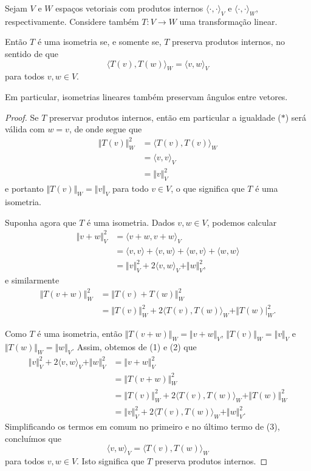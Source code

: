 \begin{theorem}
	Sejam $V$ e $W$ espaços vetoriais com produtos internos $\langle \cdot,\cdot\rangle_V$ e $\langle\cdot,\cdot\rangle_W$, respectivamente. Considere também $T\colon V\to W$ uma transformação linear.
	
	Então $T$ é uma isometria se, e somente se, $T$ preserva produtos internos, no sentido de que
	\[\langle T(v),T(w)\rangle_W=\langle v,w\rangle_V\tag{$*$}\]
	para todos $v,w\in V$.
	
	Em particular, isometrias lineares também preservam ângulos entre vetores.
\end{theorem}

\begin{proof}
	Se $T$ preservar produtos internos, então em particular a igualdade ($*$) será válida com $w=v$, de onde segue que
	\begin{align*}
		\Vert T(v)\Vert_W^2
			&=\langle T(v),T(v)\rangle_W\\
			&=\langle v,v\rangle_V\\
			&=\Vert v\Vert_V^2
	\end{align*}
	e portanto $\Vert T(v)\Vert_W=\Vert v\Vert_V$ para todo $v\in V$, o que significa que $T$ é uma isometria.
	
	Suponha agora que $T$ é uma isometria. Dados $v,w\in V$, podemos calcular
	\begin{align*}
		\Vert v+w\Vert_V^2
			&=\langle v+w,v+w\rangle_V\\
			&=\langle v,v\rangle+\langle v,w\rangle+\langle w,v\rangle+\langle w,w\rangle\\
			&=\Vert v\Vert_V^2+2\langle v,w\rangle_V+\Vert w\Vert_V^2,\tag{1}
	\end{align*}
	e similarmente
	\begin{align*}
		\Vert T(v+w)\Vert_W^2
			&=\Vert T(v)+T(w)\Vert_W^2\\
			&=\Vert T(v)\Vert_W^2+2\langle T(v),T(w)\rangle_W+\Vert T(w)\vert_W^2.\tag{2}
	\end{align*}
	
	Como $T$ é uma isometria, então $\Vert T(v+w)\Vert_W=\Vert v+w\Vert_V$, $\Vert T(v)\Vert_W=\Vert v\Vert_V$ e $\Vert T(w)\Vert_W=\Vert w\Vert_V$. Assim, obtemos de (1) e (2) que
	\begin{align*}
		\Vert v\Vert_V^2+2\langle v,w\rangle_V+\Vert w\Vert_V^2
			&=\Vert v+w\Vert_V^2\\
			&=\Vert T(v+w)\Vert_W^2\\
			&=\Vert T(v)\Vert_W^2+2\langle T(v),T(w)\rangle_W+\Vert T(w)\Vert_W^2\\
			&=\Vert v\Vert_V^2+2\langle T(v),T(w)\rangle_W+\Vert w\Vert_V^2.\tag{3}
	\end{align*}
	Simplificando os termos em comum no primeiro e no último termo de (3), concluímos que
	\[\langle v,w\rangle_V=\langle T(v),T(w)\rangle_W\]
	para todos $v,w\in V$. Isto significa que $T$ preserva produtos internos.
	

\end{proof}
